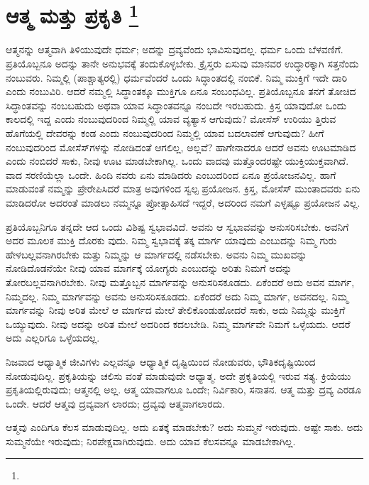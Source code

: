 
\chapter[ಆತ್ಮ ಮತ್ತು ಪ್ರಕೃತಿ ]{ಆತ್ಮ ಮತ್ತು ಪ್ರಕೃತಿ \protect\footnote{}}

ಆತ್ಮನನ್ನು ಆತ್ಮವಾಗಿ ತಿಳಿಯುವುದೇ ಧರ್ಮ; ಅದನ್ನು ದ್ರವ್ಯವೆಂದು ಭಾವಿಸುವುದಲ್ಲ. ಧರ್ಮ ಒಂದು ಬೆಳವಣಿಗೆ. ಪ್ರತಿಯೊಬ್ಬನೂ ಅದನ್ನು ತಾನೇ ಅನುಭವಕ್ಕೆ ತಂದುಕೊಳ್ಳಬೇಕು. ಕ್ರೈಸ್ತರು ಏಸುವು ಮಾನವರ ಉದ್ಧಾರಕ್ಕಾಗಿ ಸತ್ತನೆಂದು ನಂಬುವರು. ನಿಮ್ಮಲ್ಲಿ (ಪಾಶ್ಚಾತ್ಯರಲ್ಲಿ) ಧರ್ಮವೆಂದರೆ ಒಂದು ಸಿದ್ಧಾಂತದಲ್ಲಿ ನಂಬಿಕೆ. ನಿಮ್ಮ ಮುಕ್ತಿಗೆ ಇದೇ ದಾರಿ ಎಂದು ನಂಬುವಿರಿ. ಆದರೆ ನಮ್ಮಲ್ಲಿ ಸಿದ್ಧಾಂತಕ್ಕೂ ಮುಕ್ತಿಗೂ ಏನೂ ಸಂಬಂಧವಿಲ್ಲ. ಪ್ರತಿಯೊಬ್ಬನೂ ತನಗೆ ತೋಚಿದ ಸಿದ್ಧಾಂತವನ್ನು ನಂಬಬಹುದು ಅಥವಾ ಯಾವ ಸಿದ್ಧಾಂತವನ್ನೂ ನಂಬದೇ ಇರಬಹುದು. ಕ್ರಿಸ್ತ ಯಾವುದೋ ಒಂದು ಕಾಲದಲ್ಲಿ ಇದ್ದ ಎಂದು ನಂಬುವುದರಿಂದ ನಿಮ್ಮಲ್ಲಿ ಯಾವ ವ್ಯತ್ಯಾಸ ಆಗುವುದು? ಮೋಸೆಸ್​ ಉರಿಯು ತ್ತಿರುವ ಹೊಗೆಯಲ್ಲಿ ದೇವರನ್ನು ಕಂಡ ಎಂದು ನಂಬುವುದರಿಂದ ನಿಮ್ಮಲ್ಲಿ ಯಾವ ಬದಲಾವಣೆ ಆಗುವುದು? ಹೀಗೆ ನಂಬುವುದರಿಂದ ಮೋಸೆಸ್​ಗಳನ್ನು ನೋಡಿದಂತೆ ಆಗಲಿಲ್ಲ, ಅಲ್ಲವೆ? ಹಾಗೇನಾದರೂ ಆದರೆ ಅವನು ಊಟಮಾಡಿದ ಎಂದು ನಂಬಿದರೆ ಸಾಕು, ನೀವು ಊಟ ಮಾಡಬೇಕಾಗಿಲ್ಲ. ಒಂದು ವಾದವು ಮತ್ತೊಂದರಷ್ಟೇ ಯುಕ್ತಿಯುಕ್ತವಾಗಿದೆ. ವಾದ ಸರಣಿಯೆಲ್ಲಾ ಒಂದೇ. ಹಿಂದಿ ನವರು ಏನು ಮಾಡಿದರು ಎಂಬುದರಿಂದ ಏನೂ ಪ್ರಯೋಜನವಿಲ್ಲ. ಹಾಗೆ ಮಾಡುವಂತೆ ನಮ್ಮನ್ನು ಪ್ರೇರೇಪಿಸಿದರೆ ಮಾತ್ರ ಅವುಗಳಿಂದ ಸ್ವಲ್ಪ ಪ್ರಯೋಜನ. ಕ್ರಿಸ್ತ, ಮೋಸೆಸ್​ ಮುಂತಾದವರು ಏನು ಮಾಡಿದರೋ ಅದರಂತೆ ಮಾಡಲು ನಮ್ಮನ್ನೂ ಪ್ರೋತ್ಸಾಹಿಸದೆ ಇದ್ದರೆ, ಅದರಿಂದ ನಮಗೆ ಎಳ್ಳಷ್ಟೂ ಪ್ರಯೋಜನ ವಿಲ್ಲ.

ಪ್ರತಿಯೊಬ್ಬನಿಗೂ ತನ್ನದೇ ಆದ ಒಂದು ವಿಶಿಷ್ಟ ಸ್ವಭಾವವಿದೆ. ಅವನು ಆ ಸ್ವಭಾವವನ್ನು ಅನುಸರಿಸಬೇಕು. ಅವನಿಗೆ ಅದರ ಮೂಲಕ ಮುಕ್ತಿ ದೊರಕು ವುದು. ನಿಮ್ಮ ಸ್ವಭಾವಕ್ಕೆ ತಕ್ಕ ಮಾರ್ಗ ಯಾವುದು ಎಂಬುದನ್ನು ನಿಮ್ಮ ಗುರು ಹೇಳಬಲ್ಲವನಾಗಿರಬೇಕು ಮತ್ತು ನಿಮ್ಮನ್ನು ಆ ಮಾರ್ಗದಲ್ಲಿ ನಡೆಸಬೇಕು. ಅವನು ನಿಮ್ಮ ಮುಖವನ್ನು ನೋಡಿದೊಡನೆಯೇ ನೀವು ಯಾವ ಮಾರ್ಗಕ್ಕೆ ಯೋಗ್ಯರು ಎಂಬುದನ್ನು ಅರಿತು ನಿಮಗೆ ಅದನ್ನು ತೋರಬಲ್ಲವನಾಗಿರಬೇಕು. ನೀವು ಮತ್ತೊಬ್ಬನ ಮಾರ್ಗವನ್ನು ಅನುಸರಿಸಕೂಡದು. ಏಕೆಂದರೆ ಅದು ಅವನ ಮಾರ್ಗ, ನಿಮ್ಮದಲ್ಲ. ನಿಮ್ಮ ಮಾರ್ಗವನ್ನು ಅವನು ಅನುಸರಿಸಕೂಡದು. ಏಕೆಂದರೆ ಅದು ನಿಮ್ಮ ಮಾರ್ಗ, ಅವನದಲ್ಲ. ನಿಮ್ಮ ಮಾರ್ಗವನ್ನು ನೀವು ಅರಿತ ಮೇಲೆ ಆ ಮಾರ್ಗದ ಮೇಲೆ ತೇಲಿಕೊಂಡುಹೋದರೆ ಸಾಕು, ಅದು ನಿಮ್ಮನ್ನು ಮುಕ್ತಿಗೆ ಒಯ್ಯುವುದು. ನೀವು ಅದನ್ನು ಅರಿತ ಮೇಲೆ ಅದರಿಂದ ಕದಲಬೇಡಿ. ನಿಮ್ಮ ಮಾರ್ಗವೇ ನಿಮಗೆ ಒಳ್ಳೆಯದು. ಆದರೆ ಅದು ಎಲ್ಲರಿಗೂ ಒಳ್ಳೆಯದಲ್ಲ.

ನಿಜವಾದ ಆಧ್ಯಾತ್ಮಿಕ ಜೀವಿಗಳು ಎಲ್ಲವನ್ನೂ ಆಧ್ಯಾತ್ಮಿಕ ದೃಷ್ಟಿಯಿಂದ ನೋಡುವರು, ಭೌತಿಕದೃಷ್ಟಿಯಿಂದ ನೋಡುವುದಿಲ್ಲ. ಪ್ರಕೃತಿಯನ್ನು ಚಲಿಸು ವಂತೆ ಮಾಡುವುದೇ ಅಧ್ಯಾತ್ಮ. ಅದೇ ಪ್ರಕೃತಿಯಲ್ಲಿ ಇರುವ ಸತ್ಯ. ಕ್ರಿಯೆಯು ಪ್ರಕೃತಿಯಲ್ಲಿರುವುದು; ಆತ್ಮನಲ್ಲಿ ಅಲ್ಲ. ಆತ್ಮ ಯಾವಾಗಲೂ ಒಂದೇ; ನಿರ್ವಿಕಾರಿ, ಸನಾತನ. ಆತ್ಮ ಮತ್ತು ದ್ರವ್ಯ ಎರಡೂ ಒಂದೇ. ಆದರೆ ಆತ್ಮವು ದ್ರವ್ಯವಾಗ ಲಾರದು; ದ್ರವ್ಯವು ಆತ್ಮವಾಗಲಾರದು.

ಆತ್ಮವು ಎಂದಿಗೂ ಕೆಲಸ ಮಾಡುವುದಿಲ್ಲ. ಅದು ಏತಕ್ಕೆ ಮಾಡಬೇಕು? ಅದು ಸುಮ್ಮನೆ ಇರುವುದು. ಅಷ್ಟೇ ಸಾಕು. ಅದು ಸುಮ್ಮನೆಯೇ ಇರುವುದು; ನಿರಪೇಕ್ಷವಾಗಿರುವುದು. ಅದು ಯಾವ ಕೆಲಸವನ್ನೂ ಮಾಡಬೇಕಾಗಿಲ್ಲ.

